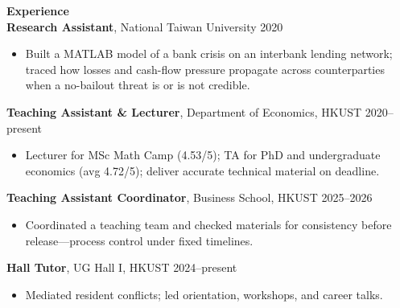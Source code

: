 \documentclass[11pt,letterpaper]{article}
\begin{document}
{\large \textbf{Experience}}\\[-0.5pt]
\textbf{Research Assistant}, National Taiwan University \hfill 2020\\
\vspace{-6pt}
\begin{itemize}
  \item Built a MATLAB model of a bank crisis on an interbank lending network; traced how losses and cash-flow pressure propagate across counterparties when a no-bailout threat is or is not credible.
\end{itemize}
\textbf{Teaching Assistant \& Lecturer}, Department of Economics, HKUST \hfill 2020--present\\
\vspace{-6pt}
\begin{itemize}
  \item Lecturer for MSc Math Camp (4.53/5); TA for PhD and undergraduate economics (avg 4.72/5); deliver accurate technical material on deadline.
\end{itemize}
\textbf{Teaching Assistant Coordinator}, Business School, HKUST \hfill 2025--2026\\
\vspace{-6pt}
\begin{itemize}
  \item Coordinated a teaching team and checked materials for consistency before release---process control under fixed timelines.
\end{itemize}
\textbf{Hall Tutor}, UG Hall I, HKUST \hfill 2024--present\\
\vspace{-6pt}
\begin{itemize}
  \item Mediated resident conflicts; led orientation, workshops, and career talks.
\end{itemize}

\vspace{0.15pt}
\end{document}
